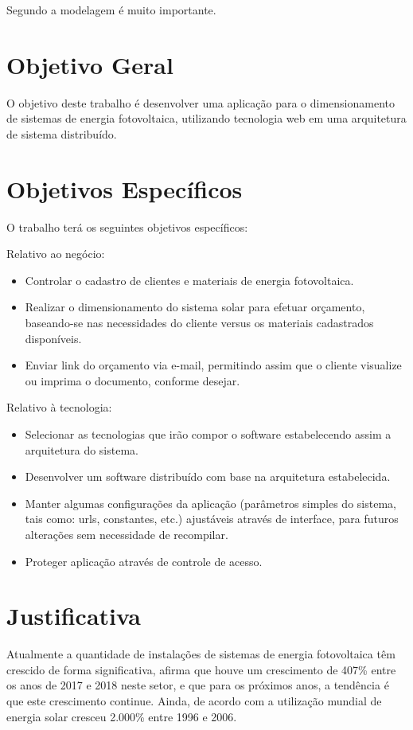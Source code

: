 Segundo  a modelagem é muito importante.

\section{Objetivo Geral}

O objetivo deste trabalho é desenvolver uma aplicação para o dimensionamento de sistemas de energia fotovoltaica, utilizando tecnologia web em uma arquitetura de sistema distribuído.

\section{Objetivos Específicos}

O trabalho terá os seguintes objetivos específicos:

Relativo ao negócio:
\begin{itemize}
	\item Controlar o cadastro de clientes e materiais de energia fotovoltaica.
	\item Realizar o dimensionamento do sistema solar para efetuar orçamento, baseando-se nas necessidades do cliente versus os materiais cadastrados disponíveis.
	\item Enviar link do orçamento via e-mail, permitindo assim que o cliente visualize ou imprima o documento, conforme desejar.
\end{itemize}

Relativo à tecnologia:
\begin{itemize}
	\item Selecionar as tecnologias que irão compor o software estabelecendo assim a arquitetura do sistema.
	\item Desenvolver um software distribuído com base na arquitetura estabelecida.
	\item Manter algumas configurações da aplicação (parâmetros simples do sistema, tais como: urls, constantes, etc.) ajustáveis através de interface, para futuros alterações sem necessidade de recompilar.
	\item Proteger aplicação através de controle de acesso.
\end{itemize}

\section{Justificativa}

Atualmente a quantidade de instalações de sistemas de energia fotovoltaica têm crescido de forma significativa,  afirma que houve um crescimento de 407\% entre os anos de 2017 e 2018 neste setor, e que para os próximos anos, a tendência é que este crescimento continue. Ainda, de acordo com  a utilização mundial de energia solar cresceu 2.000\% entre 1996 e 2006.

